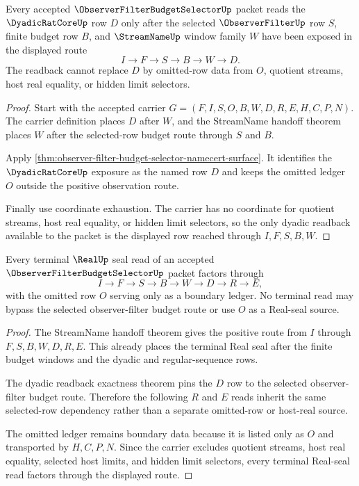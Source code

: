 \begin{theorem}
\label{thm:observer-filter-budget-selector-dyadic-readback-exactness}
Every accepted $\ObserverFilterBudgetSelectorUp$ packet reads the $\DyadicRatCoreUp$ row $D$ only after the selected $\ObserverFilterUp$ row $S$, finite budget row $B$, and $\StreamNameUp$ window family $W$ have been exposed in the displayed route
$$
I \to F \to S \to B \to W \to D.
$$
The readback cannot replace $D$ by omitted-row data from $O$, quotient streams, host real equality, or hidden limit selectors.
\end{theorem}
\begin{proof}
Start with the accepted carrier $G=(F,I,S,O,B,W,D,R,E,H,C,P,N)$. The carrier definition places $D$ after $W$, and the StreamName handoff theorem places $W$ after the selected-row budget route through $S$ and $B$.

Apply \autoref{thm:observer-filter-budget-selector-namecert-surface}. It identifies the $\DyadicRatCoreUp$ exposure as the named row $D$ and keeps the omitted ledger $O$ outside the positive observation route.

Finally use coordinate exhaustion. The carrier has no coordinate for quotient streams, host real equality, or hidden limit selectors, so the only dyadic readback available to the packet is the displayed row reached through $I,F,S,B,W$.
\end{proof}

\begin{theorem}
\label{thm:observer-filter-budget-selector-real-seal-terminality}
Every terminal $\RealUp$ seal read of an accepted $\ObserverFilterBudgetSelectorUp$ packet factors through
$$
I \to F \to S \to B \to W \to D \to R \to E,
$$
with the omitted row $O$ serving only as a boundary ledger. No terminal read may bypass the selected observer-filter budget route or use $O$ as a Real-seal source.
\end{theorem}
\begin{proof}
The StreamName handoff theorem gives the positive route from $I$ through $F,S,B,W,D,R,E$. This already places the terminal Real seal after the finite budget windows and the dyadic and regular-sequence rows.

The dyadic readback exactness theorem pins the $D$ row to the selected observer-filter budget route. Therefore the following $R$ and $E$ reads inherit the same selected-row dependency rather than a separate omitted-row or host-real source.

The omitted ledger remains boundary data because it is listed only as $O$ and transported by $H,C,P,N$. Since the carrier excludes quotient streams, host real equality, selected host limits, and hidden limit selectors, every terminal Real-seal read factors through the displayed route.
\end{proof}

